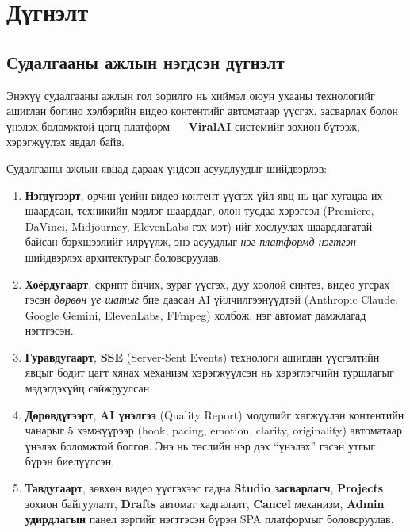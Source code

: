 
\chapter{Дүгнэлт}
\label{Chapter5}
\pagecolor{white}

\section{Судалгааны ажлын нэгдсэн дүгнэлт}

Энэхүү судалгааны ажлын гол зорилго нь хиймэл оюун ухааны технологийг ашиглан богино хэлбэрийн видео контентийг автоматаар үүсгэх, засварлах болон үнэлэх боломжтой цогц платформ --- \textbf{ViralAI} системийг зохион бүтээж, хэрэгжүүлэх явдал байв.

Судалгааны ажлын явцад дараах үндсэн асуудлуудыг шийдвэрлэв:

\begin{enumerate}
  \item \textbf{Нэгдүгээрт}, орчин үеийн видео контент үүсгэх үйл явц нь цаг хугацаа их шаардсан, техникийн мэдлэг шаарддаг, олон тусдаа хэрэгсэл (Premiere, DaVinci, Midjourney, ElevenLabs гэх мэт)-ийг хослуулах шаардлагатай байсан бэрхшээлийг илрүүлж, энэ асуудлыг \textit{нэг платформд нэгтгэн} шийдвэрлэх архитектурыг боловсруулав.

  \item \textbf{Хоёрдугаарт}, скрипт бичих, зураг үүсгэх, дуу хоолой синтез, видео угсрах гэсэн \textit{дөрвөн үе шатыг} бие даасан AI үйлчилгээнүүдтэй (Anthropic Claude, Google Gemini, ElevenLabs, FFmpeg) холбож, нэг автомат дамжлагад нэгтгэсэн.

  \item \textbf{Гуравдугаарт}, \textbf{SSE} (Server-Sent Events) технологи ашиглан үүсгэлтийн явцыг бодит цагт хянах механизм хэрэгжүүлсэн нь хэрэглэгчийн туршлагыг мэдэгдэхүйц сайжруулсан.

  \item \textbf{Дөрөвдүгээрт}, \textbf{AI үнэлгээ} (Quality Report) модулийг хөгжүүлэн контентийн чанарыг 5 хэмжүүрээр (hook, pacing, emotion, clarity, originality) автоматаар үнэлэх боломжтой болгов. Энэ нь төслийн нэр дэх ``үнэлэх'' гэсэн утгыг бүрэн биелүүлсэн.

  \item \textbf{Тавдугаарт}, зөвхөн видео үүсгэхээс гадна \textbf{Studio засварлагч}, \textbf{Projects} зохион байгуулалт, \textbf{Drafts} автомат хадгалалт, \textbf{Cancel} механизм, \textbf{Admin удирдлагын} панел зэргийг нэгтгэсэн бүрэн SPA платформыг боловсруулав.
\end{enumerate}

